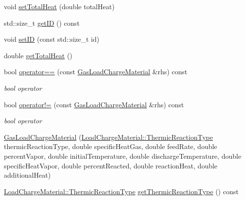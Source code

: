 \begin{DoxyCompactItemize}
\item 
void \hyperlink{class_gas_load_charge_material_aae01f6f4f923965c111e1dac66eb8365}{set\+Total\+Heat} (double total\+Heat)
\item 
std\+::size\+\_\+t \hyperlink{class_gas_load_charge_material_a32dc0d73857ebe4322cf525064713cf6}{get\+ID} () const
\item 
void \hyperlink{class_gas_load_charge_material_a24b43ba7c871453258f458a8c1f15232}{set\+ID} (const std\+::size\+\_\+t id)
\item 
double \hyperlink{class_gas_load_charge_material_a4f831537652ca09c4539982c626cc164}{get\+Total\+Heat} ()
\item 
\mbox{\label{class_gas_load_charge_material_ac1d95bdf7d61d8ed98629aa17bf2c4b1}} 
bool \hyperlink{class_gas_load_charge_material_ac1d95bdf7d61d8ed98629aa17bf2c4b1}{operator==} (const \hyperlink{class_gas_load_charge_material}{Gas\+Load\+Charge\+Material} \&rhs) const
\begin{DoxyCompactList}\small\item\em bool operator \end{DoxyCompactList}\item 
\mbox{\label{class_gas_load_charge_material_ac6bc3f665a91fde01ebf6d1528cb7332}} 
bool \hyperlink{class_gas_load_charge_material_ac6bc3f665a91fde01ebf6d1528cb7332}{operator!=} (const \hyperlink{class_gas_load_charge_material}{Gas\+Load\+Charge\+Material} \&rhs) const
\begin{DoxyCompactList}\small\item\em bool operator \end{DoxyCompactList}\item 
\hyperlink{class_gas_load_charge_material_aec7d944af0d8b649d8f971240f52d995}{Gas\+Load\+Charge\+Material} (\hyperlink{class_load_charge_material_a51d4263e865a5d86236622dd3fe23fd1}{Load\+Charge\+Material\+::\+Thermic\+Reaction\+Type} thermic\+Reaction\+Type, double specific\+Heat\+Gas, double feed\+Rate, double percent\+Vapor, double initial\+Temperature, double discharge\+Temperature, double specific\+Heat\+Vapor, double percent\+Reacted, double reaction\+Heat, double additional\+Heat)
\item 
\hyperlink{class_load_charge_material_a51d4263e865a5d86236622dd3fe23fd1}{Load\+Charge\+Material\+::\+Thermic\+Reaction\+Type} \hyperlink{class_gas_load_charge_material_ac801f30ccf58ce98fdb6b8cdb0a9767f}{get\+Thermic\+Reaction\+Type} () const

\end{DoxyCompactItemize}
